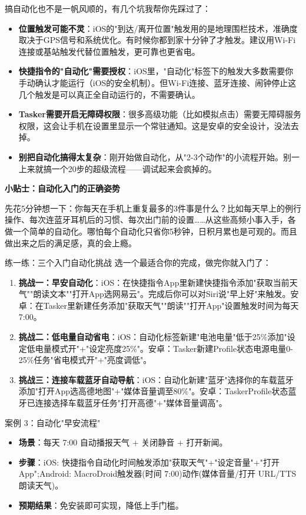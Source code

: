 搞自动化也不是一帆风顺的，有几个坑我帮你先踩过了：

\begin{itemize}
  \item \textbf{位置触发可能不灵}：iOS的"到达/离开位置"触发用的是地理围栏技术，准确度取决于GPS信号和系统优化。有时候你都到家十分钟了才触发。建议用Wi-Fi连接或基站触发代替位置触发，更可靠也更省电。
  \item \textbf{快捷指令的"自动化"需要授权}：iOS里，"自动化"标签下的触发大多数需要你手动确认才能运行（iOS的安全机制）。但Wi-Fi连接、蓝牙连接、闹钟停止这几个触发是可以真正全自动运行的，不需要确认。
  \item \textbf{Tasker需要开启无障碍权限}：很多高级功能（比如模拟点击）需要无障碍服务权限，这会让手机在设置里显示一个常驻通知。这是安卓的安全设计，没法去掉。
  \item \textbf{别把自动化搞得太复杂}：刚开始做自动化，从"2-3个动作"的小流程开始。别一上来就搞一个20步的超级流程——调试起来会疯掉的。
\end{itemize}

\textbf{小贴士：自动化入门的正确姿势}\par

先花5分钟想一下：你每天在手机上重复最多的3件事是什么？比如每天早上的例行操作、每次连蓝牙耳机后的习惯、每次出门前的设置……从这些高频小事入手，各做一个简单的自动化。哪怕每个自动化只省你5秒钟，日积月累也是可观的。而且做出来之后的满足感，真的会上瘾。

\begin{tcbpractice}{练一练：三个入门自动化挑战}
选一个最适合你的完成，做完你就入门了：

\begin{enumerate}
  \item \textbf{挑战一：早安自动化}：iOS：在快捷指令App里新建快捷指令添加"获取当前天气""朗读文本""打开App选网易云"。完成后你可以对Siri说"早上好"来触发。安卓：在Tasker里新建任务添加"获取天气""朗读""打开App"设置触发时间为每天7:00。
  \item \textbf{挑战二：低电量自动省电}：iOS：自动化标签新建"电池电量"低于25\%添加"设定低电量模式开"+"设定亮度25\%"。安卓：Tasker新建Profile状态电源电量0-25\%任务"省电模式开"+"亮度调低"。
  \item \textbf{挑战三：连接车载蓝牙自动导航}：iOS：自动化新建"蓝牙"选择你的车载蓝牙添加"打开App选高德地图"+"媒体音量调至80\%"。安卓：TaskerProfile状态蓝牙已连接选择车载蓝牙任务"打开高德"+"媒体音量调高"。
\end{enumerate}

\end{tcbpractice}

\begin{tcbinfo}{案例 3：自动化"早安流程"}
\begin{itemize}
  \item \textbf{场景}：每天 7:00 自动播报天气 + 关闭静音 + 打开新闻。
  \item \textbf{步骤}：iOS: 快捷指令自动化时间触发添加"获取天气"+"设定音量"+"打开 App";Android: MacroDroid触发器(时间 7:00)动作(媒体音量/打开 URL/TTS 朗读天气)。
  \item \textbf{预期结果}：免安装即可实现，降低上手门槛。
\end{itemize}

\end{tcbinfo}
